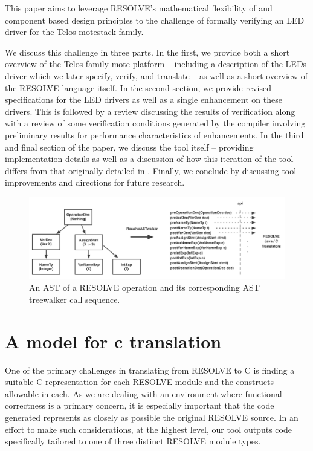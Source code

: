 \documentclass{sig-alternate}
\begin{document}
This paper aims to leverage RESOLVE's mathematical flexibility of and component based design principles to the challenge of formally verifying an LED driver for the Telos motestack family.

We discuss this challenge in three parts. In the first, we provide both a short overview of the Telos family mote platform -- including a description of the LEDs driver which we later specify, verify, and translate -- as well as a short overview of the RESOLVE language itself. In the second section, we provide revised specifications for the LED drivers as well as a single enhancement on these drivers. This is followed by a review discussing the results of verification along with a review of some verification conditions generated by the compiler involving preliminary results for performance characteristics of enhancements. In the third and final section of the paper, we discuss the tool itself -- providing implementation details as well as a discussion of how this iteration of the tool differs from that originally detailed in \cite{regula:2010}. Finally, we conclude by discussing tool improvements and directions for future research.
\begin{figure}
\centering
\includegraphics[scale=.55]{figs/ast_traversal.pdf}
\caption{An AST of a RESOLVE operation and its corresponding AST treewalker call sequence.}
\end{figure}
\label{fig:ast}
\section{A model for c translation}

One of the primary challenges in translating from RESOLVE to C is finding a suitable C representation for each RESOLVE module and the constructs allowable in each. As we are dealing with an environment where functional correctness is a primary concern, it is especially important that the code generated represents as closely as possible the original RESOLVE source. In an effort to make such considerations, at the highest level, our tool outputs code specifically tailored to one of three distinct RESOLVE module types.
\end{document}
